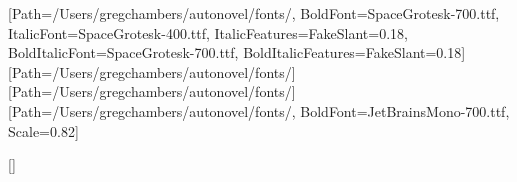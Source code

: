 \usepackage{fontspec}
\usepackage{xcolor}
\usepackage[paperwidth=6in,paperheight=9in,
            inner=0.75in,outer=0.5in,top=0.7in,bottom=0.7in]{geometry}
\usepackage{titlesec}
\usepackage{fancyhdr}
\usepackage{microtype}

\color{ink}

\def\fontsdir{/Users/gregchambers/autonovel/fonts/}
\setmainfont{SpaceGrotesk-400.ttf}[Path=\fontsdir,
  BoldFont=SpaceGrotesk-700.ttf,
  ItalicFont=SpaceGrotesk-400.ttf, ItalicFeatures={FakeSlant=0.18},
  BoldItalicFont=SpaceGrotesk-700.ttf, BoldItalicFeatures={FakeSlant=0.18}]
\newfontfamily{}[Path=\fontsdir]
\newfontfamily{}[Path=\fontsdir]
\setmonofont{JetBrainsMono-400.ttf}[Path=\fontsdir, BoldFont=JetBrainsMono-700.ttf, Scale=0.82]

\setlength{\parindent}{0pt}\setlength{\parskip}{5pt}\linespread{1.05}

\titleformat{\section}{\displaysemi\large}{}{0pt}{\MakeUppercase}[{\titlerule[0.8pt]}]
\titlespacing*{\section}{0pt}{14pt}{6pt}
\titleformat{\subsection}{\displaysemi\normalsize}{}{0pt}{}
\titlespacing*{\subsection}{0pt}{10pt}{3pt}
\titleformat{\subsubsection}{\bfseries}{}{0pt}{}

